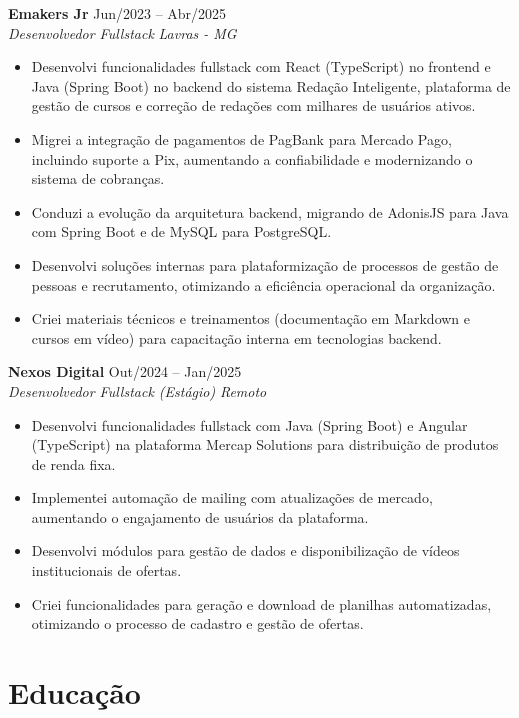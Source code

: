\documentclass[a4paper,10pt]{article}
\newcommand{\entry}[4]{
  \noindent\textbf{#1} \hfill #2 \\
  \noindent\textit{#3} \hfill \textit{#4} \\
  \vspace{2pt}
}
\begin{document}
\entry{Emakers Jr}{\faCalendar \space Jun/2023 -- Abr/2025}{Desenvolvedor Fullstack}{\faMapMarker \space Lavras - MG}
\space
\vspace{-1.6em}
\begin{itemize}
\setlength\itemsep{0em}
\item Desenvolvi funcionalidades fullstack com React (TypeScript) no frontend e Java (Spring Boot) no backend do sistema Redação Inteligente, plataforma de gestão de cursos e correção de redações com milhares de usuários ativos.
\item Migrei a integração de pagamentos de PagBank para Mercado Pago, incluindo suporte a Pix, aumentando a confiabilidade e modernizando o sistema de cobranças.
\item Conduzi a evolução da arquitetura backend, migrando de AdonisJS para Java com Spring Boot e de MySQL para PostgreSQL.
\item Desenvolvi soluções internas para plataformização de processos de gestão de pessoas e recrutamento, otimizando a eficiência operacional da organização.
\item Criei materiais técnicos e treinamentos (documentação em Markdown e cursos em vídeo) para capacitação interna em tecnologias backend.
\end{itemize}

\entry{Nexos Digital}{\faCalendar \space Out/2024 -- Jan/2025}{Desenvolvedor Fullstack (Estágio)}{\faMapMarker \space Remoto}
\space
\vspace{-1.6em}
\begin{itemize}
\setlength\itemsep{0em}
\item Desenvolvi funcionalidades fullstack com Java (Spring Boot) e Angular (TypeScript) na plataforma Mercap Solutions para distribuição de produtos de renda fixa.
\item Implementei automação de mailing com atualizações de mercado, aumentando o engajamento de usuários da plataforma.
\item Desenvolvi módulos para gestão de dados e disponibilização de vídeos institucionais de ofertas.
\item Criei funcionalidades para geração e download de planilhas automatizadas, otimizando o processo de cadastro e gestão de ofertas.
\end{itemize}

\section*{Educação}
\vspace{0.6em}
\end{document}
